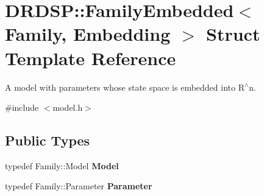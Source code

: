 \hypertarget{struct_d_r_d_s_p_1_1_family_embedded}{\section{D\-R\-D\-S\-P\-:\-:Family\-Embedded$<$ Family, Embedding $>$ Struct Template Reference}
\label{struct_d_r_d_s_p_1_1_family_embedded}
}


A model with parameters whose state space is embedded into R$^\wedge$n.  




{\ttfamily \#include $<$model.\-h$>$}

\subsection*{Public Types}
\begin{DoxyCompactItemize}
\item 
\hypertarget{struct_d_r_d_s_p_1_1_family_embedded_a8c6327b18825a5b8f4605edf827b2115}{typedef Family\-::\-Model {\bfseries Model}}\label{struct_d_r_d_s_p_1_1_family_embedded_a8c6327b18825a5b8f4605edf827b2115}

\item 
\hypertarget{struct_d_r_d_s_p_1_1_family_embedded_aab9d0969bfd84f7a7d0909b9084fcc48}{typedef Family\-::\-Parameter {\bfseries Parameter}}\label{struct_d_r_d_s_p_1_1_family_embedded_aab9d0969bfd84f7a7d0909b9084fcc48}

\end{DoxyCompactItemize}
